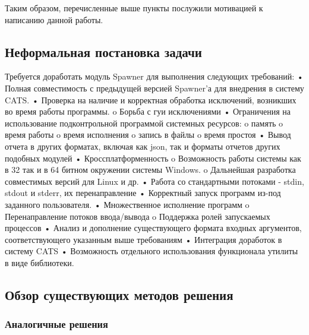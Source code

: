 \documentclass{imcs}
\begin{document}
Таким образом, перечисленные выше пункты послужили мотивацией к написанию данной работы.

\subsection{Неформальная постановка задачи}

Требуется доработать модуль Spawner для выполнения следующих требований:
•	Полная совместимость с предыдущей версией Spawner’а для внедрения в систему CATS.
•	Проверка на наличие и корректная обработка исключений, возникших во время работы программы.
o	Борьба с гуи исключениями
•	Ограничения на использование подконтрольной программой системных ресурсов:
o	память
o	время работы
o	время исполнения
o	запись в файлы
o	время простоя
•	Вывод отчета в других форматах, включая как json, так и форматы отчетов других подобных модулей
•	Кроссплатформенность
o	Возможность работы системы как в 32 так и в 64 битном окружении системы Windows.
o	Дальнейшая разработка совместимых версий для Linux и др.
•	Работа со стандартными потоками - stdin, stdout и stderr, их перенаправление
•	Корректный запуск программ из-под заданного пользователя.
•	Множественное исполнение программ
o	Перенаправление потоков ввода/вывода
o	Поддержка ролей запускаемых процессов
•	Анализ и дополнение существующего формата входных аргументов, соответствующего указанным выше требованиям
•	Интеграция доработок в систему CATS
•	Возможность отдельного использования функционала утилиты в виде библиотеки.


\subsection{Обзор существующих методов решения}

\subsubsection{Аналогичные решения}
\end{document}
